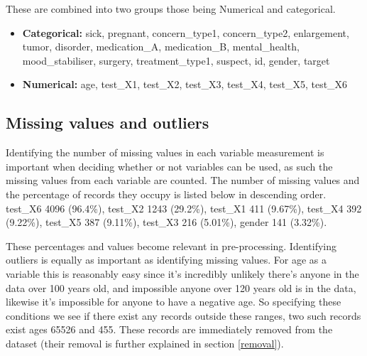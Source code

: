 \documentclass[a4paper]{article}
\begin{document}
\noindent These are combined into two groups those being Numerical and categorical.

\begin{itemize}
    \item \textbf{Categorical:} sick, pregnant, concern\_type1, concern\_type2,
                           enlargement, tumor, disorder, medication\_A,
                           medication\_B, mental\_health, mood\_stabiliser, surgery,
                           treatment\_type1, suspect, id, gender, target
    \item \textbf{Numerical:} age, test\_X1, test\_X2, test\_X3, test\_X4, test\_X5, test\_X6
\end{itemize}

\subsection*{Missing values and outliers}

Identifying the number of missing values in each variable measurement is important when deciding whether or not variables can be used, as such the missing values from each variable are counted. The number of missing values and the percentage of records they occupy is listed below in descending order.
test\_X6   4096 (96.4\%), test\_X2   1243 (29.2\%), test\_X1   411 (9.67\%), test\_X4   392 (9.22\%), test\_X5   387 (9.11\%), test\_X3   216 (5.01\%), gender   141 (3.32\%).

These percentages and values become relevant in pre-processing. Identifying outliers is equally as important as identifying missing values. For age as a variable this is reasonably easy since it's incredibly unlikely there's anyone in the data over 100 years old, and impossible anyone over 120 years old is in the data, likewise it's impossible for anyone to have a negative age. So specifying these conditions we see if there exist any records outside these ranges, two such records exist ages 65526 and 455. These records are immediately removed from the dataset (their removal is further explained in section \ref{removal}).
\end{document}
